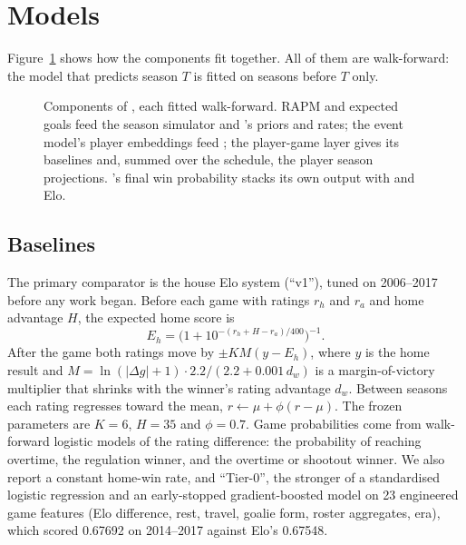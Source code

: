 \section{Models}
\label{sec:models}

Figure~\ref{fig:overview} shows how the components fit together. All of them
are walk-forward: the model that predicts season $T$ is fitted on seasons
before $T$ only.

\begin{figure}[t]
\centering

\caption{Components of \neurhl{}, each fitted walk-forward. RAPM and expected
goals feed the season simulator and \neurhlG{}'s priors and rates; the event
model's player embeddings feed \neurhlH{}; the player-game layer gives
\neurhlG{} its baselines and, summed over the schedule, the player season
projections. \neurhlG{}'s final win probability stacks its own output with
\neurhlH{} and Elo.}
\label{fig:overview}
\end{figure}

\subsection{Baselines}
\label{sec:m-elo}

The primary comparator is the house Elo system (``v1''), tuned on 2006--2017
before any \neurhl{} work began. Before each game with ratings $r_h$ and $r_a$
and home advantage $H$, the expected home score is
\begin{equation}
E_h = \bigl(1 + 10^{-(r_h + H - r_a)/400}\bigr)^{-1}.
\end{equation}
After the game both ratings move by $\pm K M (y - E_h)$, where $y$ is the home
result and $M = \ln(|\Delta g| + 1)\cdot 2.2 / (2.2 + 0.001\,d_w)$ is a
margin-of-victory multiplier that shrinks with the winner's rating advantage
$d_w$. Between seasons each rating regresses toward the mean,
$r \leftarrow \mu + \phi (r - \mu)$. The frozen parameters are $K = 6$,
$H = 35$ and $\phi = 0.7$. Game probabilities come from walk-forward logistic
models of the rating difference: the probability of reaching overtime, the
regulation winner, and the overtime or shootout winner. We also report a
constant home-win rate, and ``Tier-0'', the stronger of a standardised
logistic regression and an early-stopped gradient-boosted model
\citep{chen2016xgboost} on 23
engineered game features (Elo difference, rest, travel, goalie form, roster
aggregates, era), which scored 0.67692 on 2014--2017 against Elo's 0.67548.

